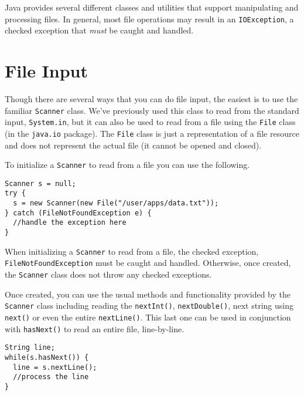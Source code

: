 

Java provides several different classes and 
utilities that support manipulating and processing
files.  In general, most file operations may
result in an \texttt{IOException}, 
a checked exception that \emph{must} be caught
and handled.

\section{File Input}

Though there are several ways that you can do file
input, the easiest is to use the familiar 
\texttt{Scanner} class.  We've previously
used this class to read from the standard input, 
\texttt{System.in}, but it can also be
used to read from a file using the \texttt{File} 
class (in the \texttt{java.io} package).  
The \texttt{File} class is just
a representation of a file resource and does not
represent the actual file (it cannot be opened and
closed).  

To initialize a \texttt{Scanner} to read
from a file you can use the following.

\begin{verbatim}
Scanner s = null;
try {
  s = new Scanner(new File("/user/apps/data.txt"));
} catch (FileNotFoundException e) {
  //handle the exception here
}
\end{verbatim}

When initializing a \texttt{Scanner} to
read from a file, the checked exception, 
\texttt{FileNotFoundException} must be caught
and handled.  Otherwise, once created, the \texttt{Scanner}
class does not throw any checked exceptions.

Once created, you can use the usual methods and functionality
provided by the \texttt{Scanner} class including
reading the \texttt{nextInt()}, \texttt{nextDouble()}, 
next string using \texttt{next()} or even the
entire \texttt{nextLine()}.  This last one
can be used in conjunction with \texttt{hasNext()}
to read an entire file, line-by-line.

\begin{verbatim}
String line;
while(s.hasNext()) {
  line = s.nextLine();
  //process the line
}
\end{verbatim}

